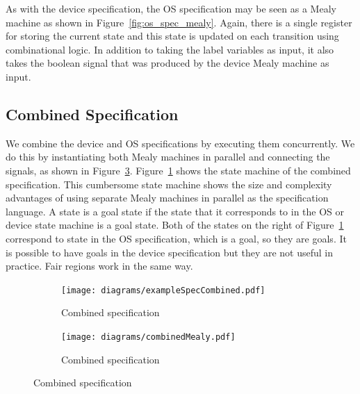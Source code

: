 As with the device specification, the OS specification may be seen as a Mealy machine as shown in Figure~\ref{fig:os_spec_mealy}. Again, there is a single register for storing the current state and this state is updated on each transition using combinational logic. In addition to taking the label variables as input, it also takes the  boolean signal that was produced by the device Mealy machine as input. 

\subsection{Combined Specification}

We combine the device and OS specifications by executing them concurrently. We do this by instantiating both Mealy machines in parallel and connecting the signals, as shown in Figure~\ref{fig:combined_spec_mealy}. Figure~\ref{fig:combined_spec} shows the state machine of the combined specification. This cumbersome state machine shows the size and complexity advantages of using separate Mealy machines in parallel as the specification language. A state is a goal state if the state that it corresponds to in the OS or device state machine is a goal state. Both of the states on the right of Figure~\ref{fig:combined_spec} correspond to state  in the OS specification, which is a goal, so they are goals. It is possible to have goals in the device specification but they are not useful in practice. Fair regions work in the same way.

\begin{figure}
\centering
\begin{subfigure}[t]{0.47\textwidth}
\texttt{[image: diagrams/exampleSpecCombined.pdf]}
\caption{Combined specification}
\label{fig:combined_spec}
\end{subfigure}
\hfill
\begin{subfigure}[t]{0.47\textwidth}
\texttt{[image: diagrams/combinedMealy.pdf]}
\caption{Combined specification}
\label{fig:combined_spec_mealy}
\end{subfigure}
\end{figure}

